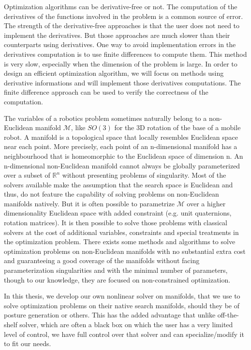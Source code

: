 Optimization algorithms can be derivative-free or not.
The computation of the derivatives of the functions involved in the problem is a common source of error.
The strength of the derivative-free approaches is that the user does not need to implement the derivatives.
But those approaches are much slower than their counterparts using derivatives.
One way to avoid implementation errors in the derivatives computation is to use finite differences to compute them.
This method is very slow, especially when the dimension of the problem is large.
In order to design an efficient optimization algorithm, we will focus on methods using derivative informations and will implement those derivatives computations.
The finite difference approach can be used to verify the correctness of the computation.

The variables of a robotics problem sometimes naturally belong to a non-Euclidean manifold $\mathcal{M}$, like $SO(3)$ for the 3D rotation of the base of a mobile robot.
A manifold is a topological space that locally resembles Euclidean space near each point.
More precisely, each point of an n-dimensional manifold has a neighbourhood that is homeomorphic to the Euclidean space of dimension n.
An n-dimensional non-Euclidean manifold cannot always be globally parameterized over a subset of $\mathbb{R}^n$ without presenting problems of singularity.
Most of the solvers available make the assumption that the search space is Euclidean and thus, do not feature the capability of solving problems on non-Euclidean manifolds natively.
But it is often possible to parametrize $\mathcal{M}$ over a higher dimensionality Euclidean space with added constraint (e.g. unit quaternions, rotation matrices).
It is then possible to solve those problems with classical solvers at the cost of additional variables, constraints and special treatments in the optimization problem.
There exists some methods and algorithms to solve optimization problems on non-Euclidean manifolds with no substantial extra cost and guaranteeing a good coverage of the manifolds without facing parameterization singularities and with the minimal number of parameters, though to our knowledge, they are focused on non-constrained optimization.

In this thesis, we develop our own nonlinear solver on manifolds, that we use to solve optimization problems on their native search manifolds, should they be of posture generation or others.
This has the added advantage that unlike off-the-shelf solver, which are often a black box on which the user has a very limited level of control, we have full control over that solver and can specialize/modify it to fit our needs.

